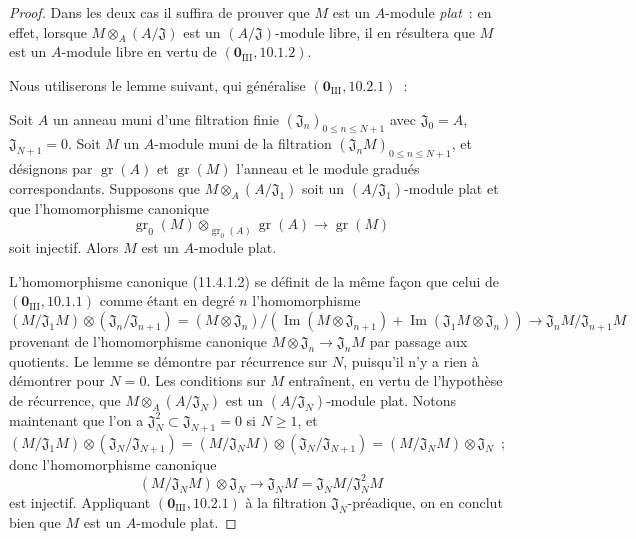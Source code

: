 \begin{proof}
Dans les deux cas il suffira de prouver que $M$ est un $A$-module \emph{plat}~:
en effet, lorsque $M\otimes_A(A/\mathfrak J)$ est un
$(A/\mathfrak J)$-module libre, il en résultera que $M$ est un $A$-module libre
en vertu de $(\mathbf 0_{\mathrm{III}},10.1.2)$.

Nous utiliserons le lemme suivant, qui généralise
$(\mathbf 0_{\mathrm{III}},10.2.1)$~:

\begin{lemma}[11.4.1.1]
\label{IV.11.4.1.1-fr}
Soit $A$ un anneau muni d'une filtration finie
$(\mathfrak J_n)_{0\leq n\leq N+1}$ avec $\mathfrak J_0=A$,
$\mathfrak J_{N+1}=0$. Soit $M$ un $A$-module muni de la filtration
$(\mathfrak J_nM)_{0\leq n\leq N+1}$, et désignons par
$\operatorname{gr}(A)$ et $\operatorname{gr}(M)$ l'anneau et le module gradués
correspondants. Supposons que $M\otimes_A(A/\mathfrak J_1)$ soit un
$(A/\mathfrak J_1)$-module plat et que l'homomorphisme canonique
\begin{equation}
\operatorname{gr}_0(M)\otimes_{\operatorname{gr}_0(A)}\operatorname{gr}(A)
\longrightarrow\operatorname{gr}(M)
\label{IV.11.4.1.2-fr}
\tag{11.4.1.2}
\end{equation}
soit injectif. Alors $M$ est un $A$-module plat.
\end{lemma}

L'homomorphisme canonique (11.4.1.2) se définit de la même façon que celui de
$(\mathbf 0_{\mathrm{III}},10.1.1)$ comme étant en degré $n$ l'homomorphisme
\[
(M/\mathfrak J_1M)\otimes(\mathfrak J_n/\mathfrak J_{n+1})
=(M\otimes\mathfrak J_n)/
(\operatorname{Im}(M\otimes\mathfrak J_{n+1})
+\operatorname{Im}(\mathfrak J_1M\otimes\mathfrak J_n))
\longrightarrow\mathfrak J_nM/\mathfrak J_{n+1}M
\]
provenant de l'homomorphisme canonique $M\otimes\mathfrak J_n\to\mathfrak J_nM$
par passage aux quotients. Le lemme se démontre par récurrence sur $N$,
puisqu'il n'y a rien à démontrer pour $N=0$.
Les conditions sur $M$ entraînent, en vertu de l'hypothèse de récurrence, que
$M\otimes_A(A/\mathfrak J_N)$ est un $(A/\mathfrak J_N)$-module plat. Notons
maintenant que l'on a $\mathfrak J_N^2\subset\mathfrak J_{N+1}=0$ si $N\geq1$,
et
$(M/\mathfrak J_1M)\otimes(\mathfrak J_N/\mathfrak J_{N+1})
=(M/\mathfrak J_NM)\otimes(\mathfrak J_N/\mathfrak J_{N+1})
=(M/\mathfrak J_NM)\otimes\mathfrak J_N$~;
donc l'homomorphisme canonique
\[
(M/\mathfrak J_NM)\otimes\mathfrak J_N
\longrightarrow\mathfrak J_NM=\mathfrak J_NM/\mathfrak J_N^2M
\]
est injectif. Appliquant $(\mathbf 0_{\mathrm{III}},10.2.1)$ à la filtration
$\mathfrak J_N$-préadique, on en conclut bien que $M$ est un $A$-module plat.


\end{proof}

